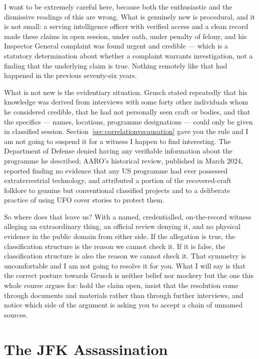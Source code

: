 I want to be extremely careful here, because both the enthusiastic and the dismissive readings of
this are wrong. What is genuinely new is procedural, and it is not small: a serving intelligence
officer with verified access and a clean record made these claims in open session, under oath,
under penalty of felony, and his Inspector General complaint was found urgent and credible ---
which is a statutory determination about whether a complaint warrants investigation, not a finding
that the underlying claim is true. Nothing remotely like that had happened in the previous
seventy-six years.

What is not new is the evidentiary situation. Grusch stated repeatedly that his knowledge was
derived from interviews with some forty other individuals whom he considered credible, that he had
not personally seen craft or bodies, and that the specifics --- names, locations, programme
designations --- could only be given in classified session.  Section~\ref{sec:correlationvscausation} gave you the rule and I am not going to
suspend it for a witness I happen to find interesting. The Department of Defense denied having any
verifiable information about the programme he described; AARO's historical review, published in
March 2024, reported finding no evidence that any US programme had ever possessed extraterrestrial
technology, and attributed a portion of the recovered-craft folklore to genuine but conventional
classified projects and to a deliberate practice of using UFO cover stories to protect them.

So where does that leave us? With a named, credentialled, on-the-record witness alleging an
extraordinary thing, an official review denying it, and no physical evidence in the public domain
from either side. If the allegation is true, the classification structure is the reason we cannot
check it. If it is false, the classification structure is also the reason we cannot check it. That
symmetry is uncomfortable and I am not going to resolve it for you. What I will say is that the
correct posture towards Grusch is neither belief nor mockery but the one this whole course argues
for: hold the claim open, insist that the resolution come through documents and materials rather
than through further interviews, and notice which side of the argument is asking you to accept a
chain of unnamed sources.

\section{The JFK Assassination}\label{sec:jfk}


